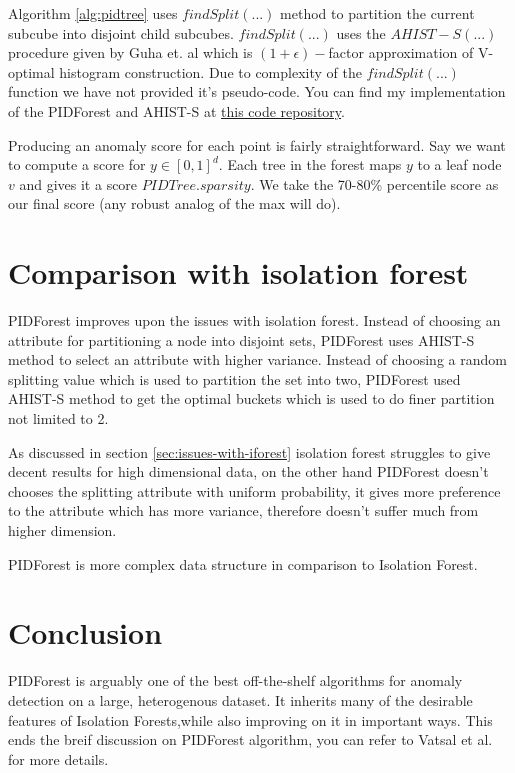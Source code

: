 \pagebreak

Algorithm \ref{alg:pidtree} uses $findSplit(...)$ method to partition the current subcube into disjoint child subcubes.
$findSplit(...)$ uses the $AHIST-S(...)$ procedure given by Guha et. al \cite{10.1145/1132863.1132873} which is $(1+\epsilon)-$factor approximation of V-optimal histogram construction. Due to complexity of the $findSplit(...)$ function we have not provided it's pseudo-code. You can find my implementation of the PIDForest and AHIST-S at \href{https://github.com/KishoreKaushal/AnomalyDetection/tree/master/pidforest}{this code repository}.


Producing an anomaly score for each point is fairly straightforward. Say we want to compute a score for $y \in [0, 1]^d$. 
Each tree in the forest maps $y$ to a leaf node $v$ and gives it a score $PIDTree.sparsity$. 
We take the 70-80\% percentile score as our final score (any robust analog of the max will do).


\section{Comparison with isolation forest}

PIDForest improves upon the issues with isolation forest. Instead of choosing an attribute for partitioning a node into disjoint sets, PIDForest uses AHIST-S method to select an attribute with higher variance. Instead of choosing a random splitting value which is used to partition the set into two, PIDForest used AHIST-S method to get the optimal buckets which is used to do finer partition not limited to 2.

As discussed in section \ref{sec:issues-with-iforest} isolation forest struggles to give decent results for high dimensional data, on the other hand PIDForest doesn't chooses the splitting attribute with uniform probability, it gives more preference to the attribute which has more variance, therefore doesn't suffer much from higher dimension.

PIDForest is more complex data structure in comparison to Isolation Forest.

\section{Conclusion}
\label{sec:pidforest-conclusion}

PIDForest is arguably one of the best off-the-shelf algorithms for anomaly detection on a large, heterogenous dataset.  
It inherits many of the desirable features of Isolation Forests,while also improving on it in important ways.
This ends the breif discussion on PIDForest algorithm, you can refer to Vatsal et al. \cite{NIPS2019_9710} for more details.

